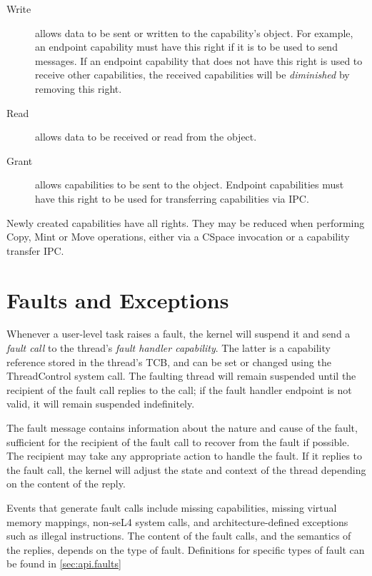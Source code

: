 \begin{description}
\item[Write] allows data to be sent or written to the capability's object. For
example, an endpoint capability must have this right if it is to be used to
send messages. If an endpoint capability that does not have this right is used to receive other capabilities, the received capabilities will be \emph{diminished} by removing this right.

\item[Read] allows data to be received or read from the object.

\item[Grant] allows capabilities to be sent to the object. Endpoint capabilities must have this right to be used for transferring capabilities via IPC.
\end{description}

Newly created capabilities have all rights. They may be reduced when performing
Copy, Mint or Move operations, either via a CSpace invocation or a capability
transfer IPC. 

\section{Faults and Exceptions}\label{sec:overview.faults}

Whenever a user-level task raises a fault, the kernel will suspend
it and send a \emph{fault call} to the thread's \emph{fault handler
capability}. The latter is a capability reference stored in the thread's TCB,
and can be set or changed using the ThreadControl system call. The faulting thread will remain suspended until the recipient of the fault call replies to the call; if the fault handler endpoint is not valid, it will remain suspended indefinitely.

The fault message contains information about the nature and cause of the
fault, sufficient for the recipient of the fault call to recover from the
fault if possible. The recipient may take any appropriate action to handle the fault. If it replies to the fault call, the kernel will adjust the state and context of the thread depending on the content of the reply.

Events that generate fault calls include missing capabilities, missing virtual memory mappings, non-seL4 system calls, and architecture-defined exceptions such as illegal instructions. The content of the fault calls, and the semantics of the replies, depends on the type of fault. Definitions for specific types of fault can be found in \autoref{sec:api.faults}

